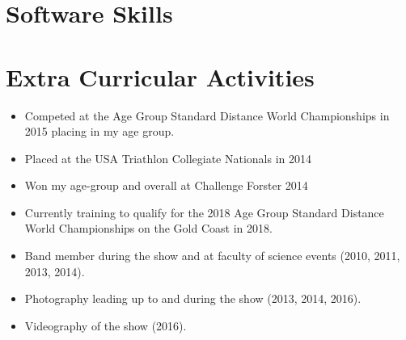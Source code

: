 \section{Software Skills}



\section{Extra Curricular Activities}

{%
  \begin{itemize}
    \item Competed at the Age Group Standard Distance World Championships in 2015 placing  in my age group.
    \item Placed  at the USA Triathlon Collegiate Nationals in 2014
    \item Won my age-group and  overall at Challenge Forster 2014
    \item Currently training to qualify for the 2018 Age Group Standard Distance World Championships on the Gold Coast in 2018.
  \end{itemize}
}

{%
\begin{itemize}
  \item Band member during the show and at faculty of science events (2010, 2011, 2013, 2014).
  \item Photography leading up to and during the show (2013, 2014, 2016).
  \item Videography of the show (2016).
\end{itemize}
}


